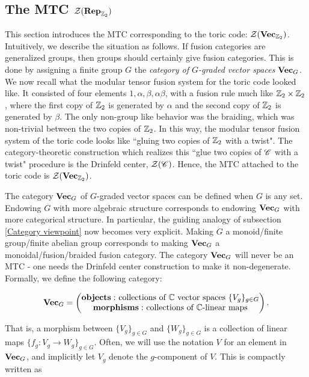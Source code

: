 \documentclass{article}
\theoremstyle{definition}
\numberwithin{figure}{section}
\begin{document}
\subsection{The MTC $\mathcal{Z}(\bold{Rep}_{\mathbb{Z}_2})$}
\label{VecZ2 MTC}

This section introduces the MTC corresponding to the toric code: $\mathcal{Z}(\bold{Vec}_{\mathbb{Z}_2})$. Intuitively, we describe the situation as follows. If fusion categories are generalized groups, then groups should certainly give fusion categories. This is done by assigning a finite group $G$ the \textit{category of $G$-graded vector spaces} $\bold{Vec}_G$. We now recall what the modular tensor fusion system for the toric code looked like. It consisted of four elements $1,\alpha,\beta,\alpha\beta$, with a fusion rule much like $\mathbb{Z}_2\times \mathbb{Z}_2$, where the first copy of $\mathbb{Z}_2$ is generated by $\alpha$ and the second copy of $\mathbb{Z}_2$ is generated by $\beta$. The only non-group like behavior was the braiding, which was non-trivial between the two copies of $\mathbb{Z}_2$. In this way, the modular tensor fusion system of the toric code looks like ``gluing two copies of $\mathbb{Z}_2$ with a twist". The category-theoretic construction which realizes this ``glue two copies of $\mathscr{C}$ with a twist" procedure is the Drinfeld center, $\mathcal{Z}(\mathscr{C})$. Hence, the MTC attached to the toric code is $\mathcal{Z}(\bold{Vec}_{\mathbb{Z}_2})$.

The category $\bold{Vec}_G$ of $G$-graded vector spaces can be defined when $G$ is any set. Endowing $G$ with more algebraic structure corresponds to endowing $\bold{Vec}_G$ with more categorical structure. In particular, the guiding analogy of subsection \ref{Category viewpoint} now becomes very explicit. Making $G$ a monoid/finite group/finite abelian group corresponds to making $\bold{Vec}_G$ a monoidal/fusion/braided fusion category. The category $\bold{Vec}_G$ will never be an MTC - one needs the Drinfeld center construction to make it non-degenerate. Formally, we define the following category:

$$\bold{Vec}_G=
\begin{pmatrix}
\bold{objects: }\text{ collections of $\mathbb{C}$ vector spaces }\{V_g\}_{g\in G}\\
\bold{morphisms: }\text{ collections of $\mathbb{C}$-linear maps}
\end{pmatrix}.$$

That is, a morphism between $\{V_g\}_{g\in G}$ and $\{W_g\}_{g\in G}$ is a collection of linear maps $\{f_g:V_g\to W_g\}_{g\in G}.$ Often, we will use the notation $V$ for an element in $\bold{Vec}_G$, and implicitly let $V_g$ denote the $g$-component of $V$. This is compactly written as
\end{document}
